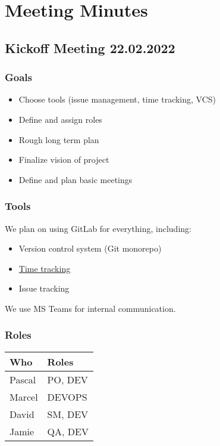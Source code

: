 \chapter{Meeting Minutes}


\section{Kickoff Meeting 22.02.2022}

\subsection{Goals}
\begin{itemize}
    \item Choose tools (issue management, time tracking, VCS)
    \item Define and assign roles
    \item Rough long term plan
    \item Finalize vision of project
    \item Define and plan basic meetings
\end{itemize}

\subsection{Tools}

We plan on using GitLab for everything, including:

\begin{itemize}
    \item Version control system (Git monorepo)
    \item \href{https://gitlab.ost.ch/SEProj/GitLab_Time_Tracking_Tutorial}{Time tracking}
    \item Issue tracking
\end{itemize}

We use MS Teams for internal communication.

\subsection{Roles}

\begin{table}[H]
    \begin{tabular}{l|l}
    \textbf{Who} & \textbf{Roles} \\
    \hline
    Pascal & PO, DEV \\
    Marcel & DEVOPS \\
    David  & SM, DEV \\
    Jamie  & QA, DEV
    \end{tabular}
\end{table}

